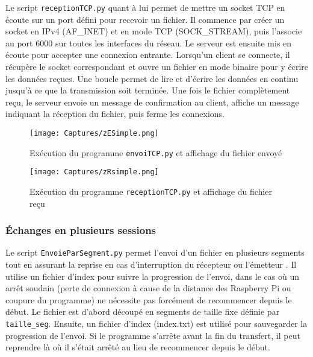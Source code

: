 \documentclass[a4paper,11pt]{article}
\begin{document}
\quad

Le script \texttt{receptionTCP.py} quant à lui permet de mettre un socket TCP en écoute sur un port défini pour recevoir un fichier. Il commence par créer un socket en IPv4 (AF\_INET) et en mode TCP (SOCK\_STREAM), puis l’associe au port 6000 sur toutes les interfaces du réseau. Le serveur est ensuite mis en écoute pour accepter une connexion entrante. Lorsqu’un client se connecte, il récupère le socket correspondant et ouvre un fichier en mode binaire pour y écrire les données reçues. Une boucle permet de lire et d’écrire les données en continu jusqu’à ce que la transmission soit terminée. Une fois le fichier complètement reçu, le serveur envoie un message de confirmation au client, affiche un message indiquant la réception du fichier, puis ferme les connexions.

\begin{figure}[H]
    \centering
    \texttt{[image: Captures/zESimple.png]}
    \caption{Exécution du programme \texttt{envoiTCP.py} et affichage du fichier envoyé}
    \label{fig:ad-hoc}
\end{figure}

\quad


\begin{figure}[H]
    \centering
    \texttt{[image: Captures/zRsimple.png]}
    \caption{Exécution du programme \texttt{receptionTCP.py} et affichage du fichier reçu}
    \label{fig:ad-hoc}
\end{figure}


\subsubsection{Échanges en plusieurs sessions}

Le script \texttt{EnvoieParSegment.py} permet l’envoi d’un fichier en plusieurs segments tout en assurant la reprise en cas d’interruption du récepteur ou l’émetteur . Il utilise un fichier d’index pour suivre la progression de l’envoi, dans le cas où un arrêt soudain (perte de connexion à cause de la distance des Raspberry Pi ou coupure du programme) ne nécessite pas forcément de recommencer depuis le début. Le fichier est d’abord découpé en segments de taille fixe définie par \texttt{taille\_seg}. Ensuite, un fichier d’index (index.txt) est utilisé pour sauvegarder la progression de l’envoi. Si le programme s’arrête avant la fin du transfert, il peut reprendre là où il s’était arrêté au lieu de recommencer depuis le début.
\end{document}
